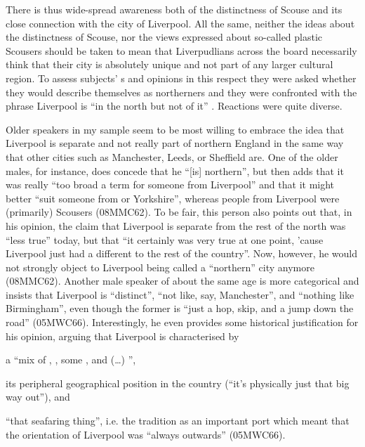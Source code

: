 There is thus wide-spread awareness both of the distinctness of Scouse and its close connection with the city of Liverpool.
All the same, neither the ideas about the distinctness of Scouse, nor the views expressed about so-called plastic Scousers should be taken to mean that Liverpudlians across the board necessarily think that their city is absolutely unique and not part of any larger cultural region.
To assess subjects' s and opinions in this respect they were asked whether they would describe themselves as northerners and they were confronted with the phrase Liverpool is ``in the north but not of it'' \parencite[xxx]{belchem2006b}.
Reactions were quite diverse.

Older speakers in my sample seem to be most willing to embrace the idea that Liverpool is separate and not really part of northern England in the same way that other cities such as Manchester, Leeds, or Sheffield are.
One of the older males, for instance, does concede that he ``[is] northern'', but then adds that it was really ``too broad a term for someone from Liverpool'' and that it might better ``suit someone from  or Yorkshire'', whereas people from Liverpool were (primarily) Scousers (08MMC62).
To be fair, this person also points out that, in his opinion, the claim that Liverpool is separate from the rest of the north was ``less true'' today, but that ``it certainly was very true at one point, 'cause Liverpool just had a different  to the rest of the country''.
Now, however, he would not strongly object to Liverpool being called a ``northern'' city anymore (08MMC62).
Another male speaker of about the same age is more categorical and insists that Liverpool is ``distinct'', ``not like, say, Manchester'', and ``nothing like Birmingham'', even though the former is ``just a hop, skip, and a jump down the road'' (05MWC66).
Interestingly, he even provides some historical justification for his opinion, arguing that Liverpool is characterised by
\begin{inparaenum}[(1)]
	\item a ``mix of , , some , and (\ldots) '',
	\item its peripheral geographical position in the country (``it's physically just that big way out''), and
	\item ``that seafaring thing'', i.e. the tradition as an important port which meant that the orientation of Liverpool was ``always outwards'' (05MWC66).
\end{inparaenum}

